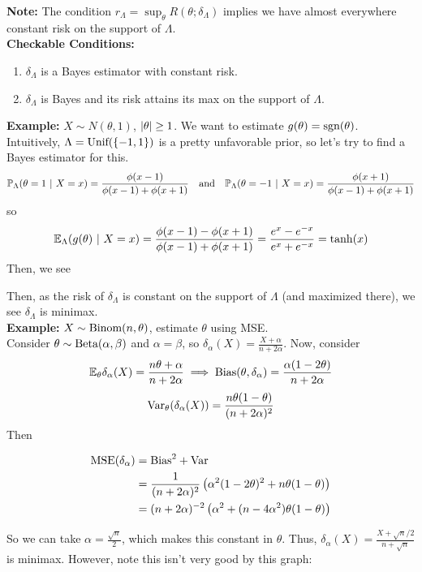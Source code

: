 \textbf{Note:} The condition $r_{\Lambda} = \sup_{\theta} R(\theta; \delta_{\Lambda})$ implies we have almost everywhere constant risk on the support of $\Lambda$.\\

\textbf{Checkable Conditions:}
\begin{enumerate}
    \item $\delta_{\Lambda}$ is a Bayes estimator with constant risk.
    \item $\delta_{\Lambda}$ is Bayes and its risk attains its max on the support of $\Lambda$.
\end{enumerate}

\textbf{Example:} $X \sim N(\theta, 1)$, $\abs{\theta} \geq 1$. We want to estimate $g(\theta) = \tt{sgn}(\theta)$.\\

Intuitively, $\Lambda = \tt{Unif}(\{-1, 1\})$ is a pretty unfavorable prior, so let's try to find a Bayes estimator for this.
\[ \bb{P}_{\Lambda}(\theta = 1 \given X = x) = \frac{\phi(x - 1)}{\phi(x - 1) + \phi(x + 1)} \quand \bb{P}_{\Lambda}(\theta = -1 \given X = x) = \frac{\phi(x + 1)}{\phi(x - 1) + \phi(x + 1)} \]
so
\[ \E_{\Lambda}(g(\theta) \given X = x) = \frac{\phi(x - 1) - \phi(x + 1)}{\phi(x - 1) + \phi(x + 1)} = \frac{e^{x} - e^{-x}}{e^{x} + e^{-x}} = \tanh(x) \]
Then, we see

Then, as the risk of $\delta_{\Lambda}$ is constant on the support of $\Lambda$ (and maximized there), we see $\delta_{\Lambda}$ is minimax.\\

\textbf{Example:} $X \sim \Binom(n, \theta)$, estimate $\theta$ using MSE.\\

Consider $\theta \sim \tt{Beta}(\alpha, \beta)$ and $\alpha = \beta$, so $\delta_{\alpha}(X) = \frac{X + \alpha}{n + 2\alpha}$. Now, consider
\[ \E_{\theta}\delta_{\alpha}(X) = \frac{n\theta + \alpha}{n + 2\alpha} \implies \tt{Bias}(\theta, \delta_{\alpha}) = \frac{\alpha(1 - 2\theta)}{n + 2\alpha} \]
\[ \Var_{\theta}(\delta_{\alpha}(X)) = \frac{n\theta(1 - \theta)}{(n + 2\alpha)^2} \]
Then

\begin{align*}
    \tt{MSE}(\delta_{\alpha}) &= \tt{Bias}^2 + \Var\\
    &= \frac{1}{(n + 2\alpha)^2}\left(\alpha^2(1 - 2\theta)^2 + n\theta(1 - \theta)\right)\\
    &= (n + 2\alpha)^{-2}\left(\alpha^2 + (n - 4\alpha^2)\theta(1 - \theta)\right)
\end{align*}

So we can take $\alpha = \frac{\sqrt{n}}{2}$, which makes this constant in $\theta$. Thus, $\delta_{\alpha}(X) = \frac{X + \sqrt{n}/2}{n + \sqrt{n}}$ is minimax. However, note this isn't very good by this graph:
